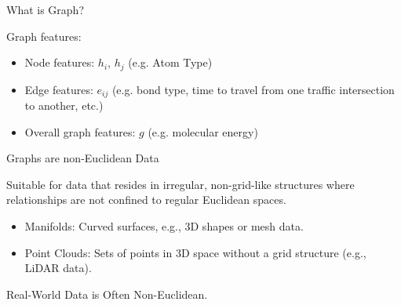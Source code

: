 \documentclass[aspectratio=169,xcolor=dvipsnames,svgnames,x11names,fleqn]{beamer}
\begin{document}
\begin{frame}{What is Graph?}

Graph features:

\begin{itemize}
\item Node features: $h_i$, $h_j$ (e.g. Atom Type)
\item Edge features: $e_{ij}$ (e.g. bond type, time to travel from one traffic intersection to another, etc.)
\item Overall graph features: $g$ (e.g. molecular energy)
\end{itemize}

\end{frame}

\begin{frame}{Graphs are non-Euclidean Data}

\begin{center}
Suitable for data that resides in irregular, non-grid-like structures where relationships are not confined to regular
Euclidean spaces.
\end{center}

\vspace{10pt}

\begin{itemize}
\item Manifolds: Curved surfaces, e.g., 3D shapes or mesh data.
\item Point Clouds: Sets of points in 3D space without a grid
structure (e.g., LiDAR data).
\end{itemize}

\vspace{10pt}

Real-World Data is Often Non-Euclidean.


\end{frame}
\end{document}
